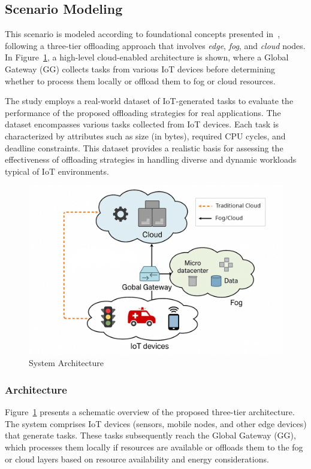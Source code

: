 \documentclass[preprint,3p,authoryear]{elsarticle}
\begin{document}
\subsection{Scenario Modeling}\label{sec:scenario_modeling}

This scenario is modeled according to foundational concepts presented in~\cite{aazam_cloud_2022, bukhari_intelligent_2022, jazayeri_autonomous_2021}, following a three-tier offloading approach that involves \textit{edge}, \textit{fog}, and \textit{cloud} nodes. In Figure~\ref{fig:cloud-architecture}, a high-level cloud-enabled architecture is shown, where a Global Gateway (GG) collects tasks from various IoT devices before determining whether to process them locally or offload them to fog or cloud resources.

The study employs a real-world dataset of IoT-generated tasks to evaluate the performance of the proposed offloading strategies for real applications. The dataset encompasses various tasks collected from IoT devices. Each task is characterized by attributes such as size (in bytes), required CPU cycles, and deadline constraints. This dataset provides a realistic basis for assessing the effectiveness of offloading strategies in handling diverse and dynamic workloads typical of IoT environments.


\begin{figure}[ht]
    \centering
    \includegraphics[width=0.75\linewidth]{figs/cloud_architecture.png}
    \caption{System Architecture}\label{fig:cloud-architecture}
\end{figure}


\subsubsection{Architecture}\label{subsec:architecture}

Figure~\ref{fig:cloud-architecture} presents a schematic overview of the proposed three-tier architecture. The system comprises IoT devices (sensors, mobile nodes, and other edge devices) that generate tasks. These tasks subsequently reach the Global Gateway (GG), which processes them locally if resources are available or offloads them to the fog or cloud layers based on resource availability and energy considerations.
\end{document}
